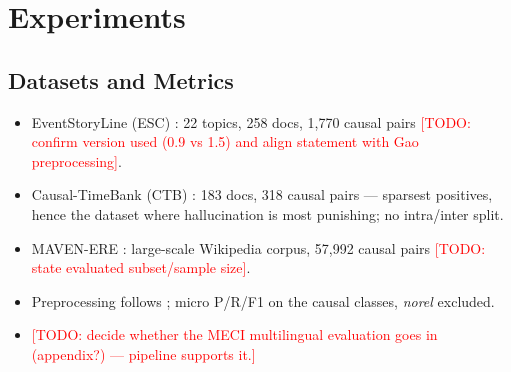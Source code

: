 \documentclass[11pt]{article}
\newcommand{\todo}[1]{\textcolor{red}{[TODO: #1]}}
\begin{document}
\section{Experiments}
\label{sec:experiments}

\subsection{Datasets and Metrics}
\begin{itemize}
  \item EventStoryLine (ESC) \citep{caselli2017event}: 22 topics, 258 docs,
        1{,}770 causal pairs \todo{confirm version used (0.9 vs 1.5) and align
        statement with Gao preprocessing}.
  \item Causal-TimeBank (CTB) \citep{mirza2014annotating}: 183 docs, 318 causal
        pairs --- sparsest positives, hence the dataset where hallucination is
        most punishing; no intra/inter split.
  \item MAVEN-ERE \citep{wang2022mavenere}: large-scale Wikipedia corpus,
        57{,}992 causal pairs \todo{state evaluated subset/sample size}.
  \item Preprocessing follows \citet{gao2023chatgpt}; micro P/R/F1 on the causal
        classes, \textit{norel} excluded.
  \item \todo{decide whether the MECI multilingual evaluation
        \citep{lai2022meci} goes in (appendix?) --- pipeline supports it.}
\end{itemize}
\end{document}
